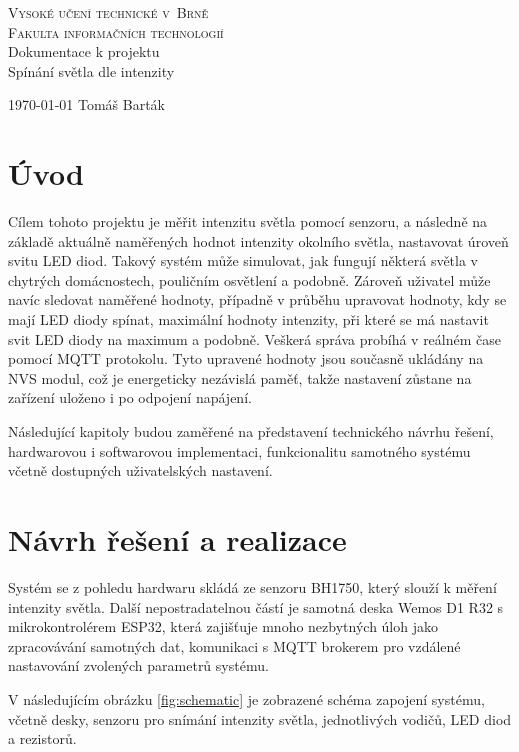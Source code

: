 \documentclass[a4paper, 11pt, hidelinks]{article}
\begin{document}
\begin{titlepage}
	\begin{center}
		\textsc{
			\Huge{Vysoké učení technické v~Brně}\\
			\huge{Fakulta informačních technologií\\}
		}
		\LARGE{
			Dokumentace k projektu\\
			\Huge{Spínání světla dle intenzity}\\
		}
	\end{center}
	{\Large{
        \today
		\hfill
		Tomáš Barták
		}
	}
\end{titlepage}
\newpage

\section{Úvod}
Cílem tohoto projektu je měřit intenzitu světla pomocí senzoru, a následně na základě aktuálně naměřených hodnot intenzity okolního světla, nastavovat úroveň svitu LED diod. Takový systém může simulovat, jak fungují některá světla v chytrých domácnostech, pouličním osvětlení a podobně. Zároveň uživatel může navíc sledovat naměřené hodnoty, případně v průběhu upravovat hodnoty, kdy se mají LED diody spínat, maximální hodnoty intenzity, při které se má nastavit svit LED diody na maximum a podobně. Veškerá správa probíhá v reálném čase pomocí MQTT protokolu. Tyto upravené hodnoty jsou současně ukládány na NVS modul, což je energeticky nezávislá paměť, takže nastavení zůstane na zařízení uloženo i po odpojení napájení.

Následující kapitoly budou zaměřené na představení technického návrhu řešení, hardwarovou i softwarovou implementaci, funkcionalitu samotného systému včetně dostupných uživatelských nastavení.

\section{Návrh řešení a realizace}

Systém se z pohledu hardwaru skládá ze senzoru BH1750, který slouží k měření intenzity světla. Další nepostradatelnou částí je samotná deska Wemos D1 R32 s mikrokontrolérem ESP32, která zajišťuje mnoho nezbytných úloh jako zpracovávání samotných dat, komunikaci s MQTT brokerem pro vzdálené nastavování zvolených parametrů systému. 

V následujícím obrázku \ref{fig:schematic} je zobrazené schéma zapojení systému, včetně desky, senzoru pro snímání intenzity světla, jednotlivých vodičů, LED diod a rezistorů.
\end{document}
